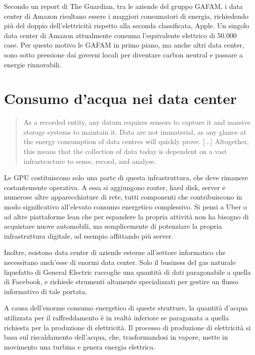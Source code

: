 \documentclass[12pt,a4paper,oneside]{book}
\begin{document}
Secondo un report di The Guardian\cite{guardian2024datacenters}, tra le aziende del gruppo GAFAM, i data center di Amazon risultano essere i maggiori consumatori di energia, richiedendo più del doppio dell'elettricità rispetto alla seconda classificata, Apple. Un singolo data center di Amazon attualmente consuma l'equivalente elettrico di 50.000 case. Per questo motivo le GAFAM in primo piano, ma anche altri data center, sono sotto pressione dai governi locali per diventare carbon neutral e passare a energie rinnovabili.

\chapter{Consumo d'acqua nei data center}

\begin{quote}
\small
As a recorded entity, any datum requires sensors to capture it and massive storage systems to maintain it. Data are not immaterial, as any glance at the energy consumption of data centres will quickly prove. [...] Altogether, this means that the collection of data today is dependent on a vast infrastructure to sense, record, and analyse.\citep[p.28]{srnicek2017platform}
\end{quote}

Le GPU costituiscono solo una parte di questa infrastruttura, che deve rimanere costantemente operativa. A essa si aggiungono router, hard disk, server e numerose altre apparecchiature di rete, tutti componenti che contribuiscono in modo significativo all’elevato consumo energetico complessivo. Si pensi a Uber o ad altre piattaforme lean che per espandere la propria attività non ha bisogno di acquistare nuove automobili, ma semplicemente di potenziare la propria infrastruttura digitale, ad esempio affittando più server. \citep[p.31]{srnicek2017platform}

Inoltre, esistono data center di aziende esterne all'settore informatico che necessitano anch'esse di enormi data center. Solo il business del gas naturale liquefatto di General Electric raccoglie una quantità di dati paragonabile a quella di Facebook, e richiede strumenti altamente specializzati per gestire un flusso informativo di tale portata. \citep[p.40]{srnicek2017platform}

A causa dell'enorme consumo energetico di queste strutture, la quantità d'acqua utilizzata per il raffreddamento è in realtà inferiore se paragonata a quella richiesta per la produzione di elettricità. Il processo di produzione di elettricità si basa sul riscaldamento dell'acqua, che, trasformandosi in vapore, mette in movimento una turbina e genera energia elettrica.
\end{document}
